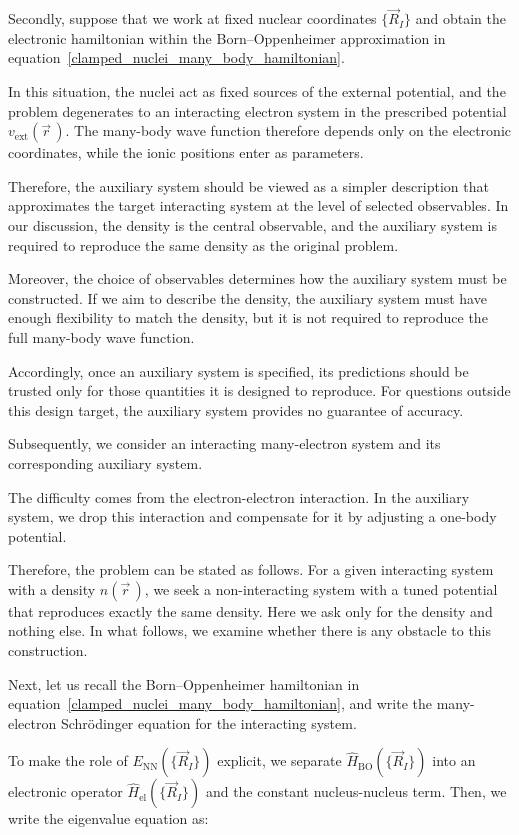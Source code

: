 Secondly, suppose that we work at fixed nuclear coordinates $\{\vec{R}_I\}$ and obtain the electronic hamiltonian within the Born--Oppenheimer approximation in equation~\eqref{clamped_nuclei_many_body_hamiltonian}.

In this situation, the nuclei act as fixed sources of the external potential, and the problem degenerates to an interacting electron system in the prescribed potential $v_\mathrm{ext}(\vec{r}\,)$.
The many-body wave function therefore depends only on the electronic coordinates, while the ionic positions enter as parameters.

Therefore, the auxiliary system should be viewed as a simpler description that approximates the target interacting system at the level of selected observables.
In our discussion, the density is the central observable, and the auxiliary system is required to reproduce the same density as the original problem.

Moreover, the choice of observables determines how the auxiliary system must be constructed.
If we aim to describe the density, the auxiliary system must have enough flexibility to match the density, but it is not required to reproduce the full many-body wave function.

Accordingly, once an auxiliary system is specified, its predictions should be trusted only for those quantities it is designed to reproduce.
For questions outside this design target, the auxiliary system provides no guarantee of accuracy.

Subsequently, we consider an interacting many-electron system and its corresponding auxiliary system.

The difficulty comes from the electron-electron interaction.
In the auxiliary system, we drop this interaction and compensate for it by adjusting a one-body potential.

Therefore, the problem can be stated as follows.
For a given interacting system with a density $n(\vec{r}\,)$, we seek a non-interacting system with a tuned potential that reproduces exactly the same density.
Here we ask only for the density and nothing else.
In what follows, we examine whether there is any obstacle to this construction.

Next, let us recall the Born--Oppenheimer hamiltonian in equation~\eqref{clamped_nuclei_many_body_hamiltonian}, 
and write the many-electron Schrödinger equation for the interacting system.

To make the role of $E_\mathrm{NN}(\{\vec{R}_I\})$ explicit,
we separate $\hat{H}_\mathrm{BO}(\{\vec{R}_I\})$ into an electronic operator $\hat{H}_\mathrm{el}(\{\vec{R}_I\})$ and the constant nucleus-nucleus term.
Then, we write the eigenvalue equation as:


